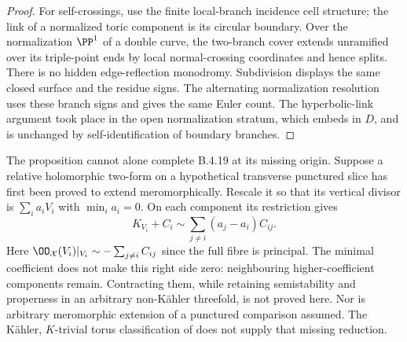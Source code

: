 \begin{proof}
For self-crossings, use the finite local-branch
incidence cell structure; the link of a normalized
toric component is its circular boundary. Over the
normalization $\PP^1$ of a double curve, the two-branch
cover extends unramified over its triple-point ends
by local normal-crossing coordinates and hence splits.
There is no hidden edge-reflection monodromy. Subdivision
displays the same closed surface and the residue signs.
The alternating normalization resolution uses these
branch signs and gives the same Euler count. The
hyperbolic-link argument took place in the open
normalization stratum, which embeds in $D$, and is
unchanged by self-identification of boundary branches.
\end{proof}

\begin{remark}
The proposition cannot alone complete B.4.19 at its
missing origin. Suppose a relative holomorphic two-form
on a hypothetical transverse punctured slice has first
been proved to extend meromorphically. Rescale it so
that its vertical divisor is $\sum_i a_iV_i$ with
$\min_i a_i=0$. On each component its restriction gives
\[
 K_{V_i}+C_i\sim\sum_{j\ne i}(a_j-a_i)C_{ij}.          \tag{B.4.28.11}
\]
Here $\OO_{\mathcal X}(V_i)|_{V_i}\sim
-\sum_{j\ne i}C_{ij}$ since the full fibre is principal.
The minimal coefficient does not make this right side
zero: neighbouring higher-coefficient components remain.
Contracting them, while retaining semistability and
properness in an arbitrary non-K\"ahler threefold, is
not proved here. Nor is arbitrary meromorphic extension
of a punctured comparison assumed. The K\"ahler,
$K$-trivial torus classification of
\citet[Theorem 3.1]{KamenovaToriRoot} does not supply
that missing reduction.
\end{remark}

